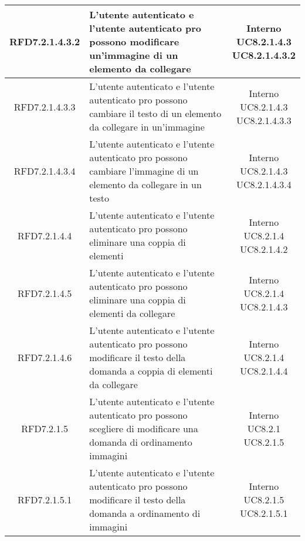 \begin{longtable}{|c|>{\centering}m{7cm}|c|}
			 \hypertarget{{RFD7.2.1.4.3.2}}{{RFD7.2.1.4.3.2}} & L’utente autenticato e l'utente autenticato pro possono modificare un’immagine di un elemento da collegare & \makecell{Interno\\ UC8.2.1.4.3 \\UC8.2.1.4.3.2 } \\ \hline
			 \hypertarget{{RFD7.2.1.4.3.3}}{{RFD7.2.1.4.3.3}} & L’utente autenticato e l'utente autenticato pro possono cambiare il testo di un elemento da collegare in un'immagine & \makecell{Interno\\ UC8.2.1.4.3 \\UC8.2.1.4.3.3 } \\ \hline
			 \hypertarget{{RFD7.2.1.4.3.4}}{{RFD7.2.1.4.3.4}} & L’utente autenticato e l'utente autenticato pro possono cambiare l’immagine di un elemento da collegare in un testo & \makecell{Interno\\ UC8.2.1.4.3 \\UC8.2.1.4.3.4 } \\ \hline
			 \hypertarget{{RFD7.2.1.4.4}}{{RFD7.2.1.4.4}} & L’utente autenticato e l'utente autenticato pro possono eliminare una coppia di elementi & \makecell{Interno\\ UC8.2.1.4 \\UC8.2.1.4.2 } \\ \hline
			 \hypertarget{{RFD7.2.1.4.5}}{{RFD7.2.1.4.5}} & L’utente autenticato e l'utente autenticato pro possono eliminare una coppia di elementi da collegare & \makecell{Interno\\ UC8.2.1.4 \\UC8.2.1.4.3 } \\ \hline
			 \hypertarget{{RFD7.2.1.4.6}}{{RFD7.2.1.4.6}} & L’utente autenticato e l'utente autenticato pro possono modificare il testo della domanda a coppia di elementi da collegare  & \makecell{Interno\\ UC8.2.1.4 \\UC8.2.1.4.4 } \\ \hline
			 \hypertarget{{RFD7.2.1.5}}{{RFD7.2.1.5}} & L’utente autenticato e l’utente autenticato pro possono scegliere di modificare una domanda di ordinamento immagini & \makecell{Interno\\ UC8.2.1 \\UC8.2.1.5 } \\ \hline
			 \hypertarget{{RFD7.2.1.5.1}}{{RFD7.2.1.5.1}} & L’utente autenticato e l'utente autenticato pro possono modificare il testo della domanda a ordinamento di immagini & \makecell{Interno\\ UC8.2.1.5 \\UC8.2.1.5.1 } \\ \hline

\end{longtable}
